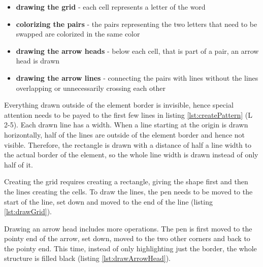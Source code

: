 \begin{itemize}
  \item \textbf{drawing the grid} - each cell represents a letter of the word
  \item \textbf{colorizing the pairs} - the pairs representing the two letters that need to be swapped are colorized in the same color
  \item \textbf{drawing the arrow heads} - below each cell, that is part of a pair, an arrow head is drawn
  \item \textbf{drawing the arrow lines} - connecting the pairs with lines without the lines overlapping or unnecessarily crossing each other
\end{itemize}

Everything drawn outside of the  element border is invisible, hence special attention needs to be payed to the first few lines in listing \ref{lst:createPattern} (L 2-5). Each drawn line has a width. When a line starting at the origin is drawn horizontally, half of the lines are outside of the  element border and hence not visible. Therefore, the rectangle is drawn with a distance of half a line width to the actual border of the  element, so the whole line width is drawn instead of only half of it. 

Creating the grid requires creating a rectangle, giving the shape first and then the lines creating the cells. To draw the lines, the pen needs to be moved to the start of the line, set down and moved to the end of the line (listing \ref{lst:drawGrid}). 

Drawing an arrow head includes more operations. The pen is first moved to the pointy end of the arrow, set down, moved to the two other corners and back to the pointy end. This time, instead of only highlighting just the border, the whole structure is filled black (listing \ref{lst:drawArrowHead}).

